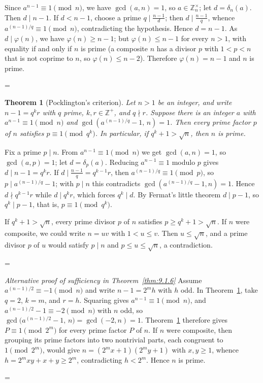 \documentclass[11pt]{article}
\makeatletter
\theoremstyle{ntstyle}
\newtheorem{theorem}{Theorem}[subsection]
\let\nt@closedisplay\]
\def\nt@guardedclose{\@ifnextchar\par{\nt@closeafterpar}{\@ifnextchar\end{\postdisplaypenalty\@M\nt@closedisplay}{\nt@closedisplay}}}
\def\nt@closeafterpar\par{\@ifnextchar\par{\nt@closeafterpar}{\@ifnextchar\end{\postdisplaypenalty\@M\nt@closedisplay\par}{\nt@closedisplay\par}}}
\renewenvironment{proof}[1][\proofname]{\par
  \pushQED{\qed}\normalfont\topsep\medskipamount\edef\nt@afterproof{\@endparpenalty=\the\@endparpenalty\relax}\@beginparpenalty\@M\@endparpenalty\@M\let\]\nt@guardedclose\trivlist\item[]\textit{#1\@addpunct{.}} \ignorespaces}{\ifvmode\addpenalty\@M\fi\popQED\nt@afterproof\endtrivlist\@endpefalse}
\newenvironment{altproof}[1][\proofname]{\begin{proof}[#1]\renewcommand{\qedsymbol}{}}{\end{proof}}
\newcommand{\ZmodUnits}[1]{\mathbb{Z}_{#1}^{\times}}
\makeatother
\begin{document}
\begin{proof} Since $a^{n-1}\equiv1\pmod{n}$,
	we have $\gcd(a, n)=1$, so $a\in\ZmodUnits{n}$; let
	$d=\delta_n(a)$. Then $d\mid n-1$. If $d<n-1$, choose a
	prime $q\mid\tfrac{n-1}{d}$; then $d\mid\tfrac{n-1}{q}$, whence
	$a^{(n-1)/q}\equiv1\pmod{n}$, contradicting the hypothesis. Hence
	$d=n-1$. As $d\mid\varphi(n)$, we have $\varphi(n)\ge n-1$; but $\varphi(n)\le n-1$ for every $n>1$, with equality if and only if $n$ is prime (a composite $n$ has a divisor $p$ with $1<p<n$ that is not coprime to $n$, so $\varphi(n)\le n-2$). Therefore $\varphi(n)=n-1$ and $n$ is prime.

\end{proof}
\begin{theorem}[Pocklington's criterion]\label{thm:9.1.9} Let
	$n>1$ be an integer, and write $n-1=q^{k}r$ with $q$ prime,
	$k,r\in\mathbb{Z}^+$, and $q\nmid r$. Suppose there is an
	integer $a$ with $a^{n-1}\equiv1\pmod{n}$ and
	$\gcd\left(a^{(n-1)/q}-1,\,n\right)=1$. Then every prime factor $p$
	of $n$ satisfies $p\equiv1\pmod{q^{k}}$.
	In particular, if $q^k+1>\sqrt n$, then $n$ is prime.

\end{theorem}

\begin{proof} Fix a prime $p\mid n$. From
	$a^{n-1}\equiv1\pmod{n}$ we get $\gcd(a, n)=1$, so $\gcd(a, p)=1$; let
	$d=\delta_p(a)$. Reducing $a^{n-1}\equiv1$ modulo $p$
	gives $d\mid n-1=q^{k}r$. If $d\mid\tfrac{n-1}{q}=q^{k-1}r$, then
	$a^{(n-1)/q}\equiv1\pmod{p}$, so $p\mid a^{(n-1)/q}-1$; with $p\mid n$
	this contradicts $\gcd(a^{(n-1)/q}-1, n)=1$. Hence $d\nmid q^{k-1}r$
	while $d\mid q^{k}r$, which forces $q^{k}\mid d$. By Fermat's little
	theorem $d\mid p-1$, so $q^{k}\mid p-1$, that is, $p\equiv1\pmod{q^{k}}$.

	If $q^k+1>\sqrt n$, every prime divisor $p$ of $n$ satisfies
	$p\ge q^k+1>\sqrt n$. If $n$ were composite, we could write $n=uv$
	with $1<u\le v$. Then $u\le\sqrt n$, and a prime divisor
	$p$ of $u$ would satisfy $p\mid n$ and $p\le u\le\sqrt n$,
	a contradiction.

\end{proof}
\begin{altproof}[Alternative proof of sufficiency in Theorem~\ref{thm:9.1.6}] Assume $a^{(n-1)/2}\equiv-1\pmod{n}$ and write $n-1=2^{m}h$
	with $h$ odd. In Theorem~\ref{thm:9.1.9}, take $q=2$, $k=m$, and
	$r=h$. Squaring
	gives $a^{n-1}\equiv1\pmod{n}$, and $a^{(n-1)/2}-1\equiv-2\pmod{n}$ with
	$n$ odd, so $\gcd\big(a^{(n-1)/2}-1,\,n\big)=\gcd(-2,n)=1$. Theorem~\ref{thm:9.1.9} therefore gives $P\equiv1\pmod{2^{m}}$ for every prime factor $P$
	of $n$. If $n$ were composite, then grouping its prime factors into two
	nontrivial parts, each congruent to $1\pmod{2^{m}}$, would give
	$n=(2^{m}x+1)(2^{m}y+1)$ with $x,y\ge1$, whence
	$h=2^{m}xy+x+y\ge2^{m}$, contradicting $h<2^{m}$. Hence $n$ is prime.

\end{altproof}
\end{document}
